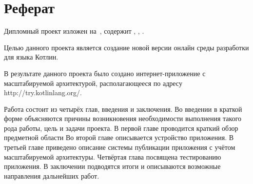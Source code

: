 \chapter*{Реферат}
	Дипломный проект изложен на~, содержит , , .

	Целью данного проекта является создание новой версии онлайн среды разработки для языка Котлин.

	В результате данного проекта было создано интернет-приложение с масштабируемой архитектурой, располагающееся по адресу\\ http://try.kotlinlang.org/. 
	
	Работа состоит из четырёх глав, введения и заключения.
Во введении в краткой форме объясняются причины возникновения необходимости выполнения такого рода работы, цель и задачи проекта.
В первой главе проводится краткий обзор предметной области
Во второй главе описывается устройство приложения.
В третьей главе приведено описание системы публикации приложения с учётом масштабируемой архитектуры.
Четвёртая глава посвящена тестированию приложения.
В заключении подводятся итоги и описываются возможные направления дальнейших работ.

\clearpage